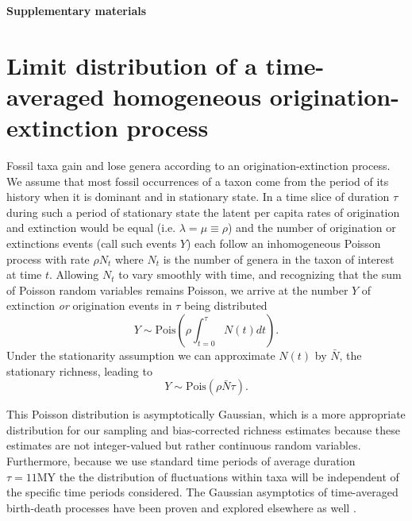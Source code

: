 \documentclass[12pt]{article}
\let\citep=\cite
\begin{document}
\clearpage

\newcommand{\beginsupplement}{%
  \setcounter{table}{0}
  \renewcommand{\thetable}{S\arabic{table}}%
  \setcounter{figure}{0}
  \renewcommand{\thefigure}{S\arabic{figure}}%
  \setcounter{section}{0}
  \renewcommand{\thesection}{S\arabic{section}}%
}

\beginsupplement

\begin{center}
{\LARGE \bf Supplementary materials}
\end{center}
\vspace{2em}

\section{Limit distribution of a time-averaged homogeneous
  origination-extinction process}
\label{sec:suppLimitDist}

Fossil taxa gain and lose genera according to an
origination-extinction process. We assume that most fossil occurrences
of a taxon come from the period of its history when it is dominant and
in stationary state. In a time slice of duration $\tau$ during such a
period of stationary state the latent per capita rates of origination and
extinction would be equal (i.e. $\lambda = \mu \equiv \rho$) and the
number of origination or extinctions events (call such events $Y$)
each follow an inhomogeneous Poisson process with rate $\rho N_t$
where $N_t$ is the number of genera in the taxon of interest at time
$t$. Allowing $N_t$ to vary smoothly with time, and recognizing that
the sum of Poisson random variables remains Poisson, we arrive at the
number $Y$ of extinction \emph{or} origination events in $\tau$ being
distributed
\begin{equation}
  \label{eq:eventPois1}
  Y \sim \text{Pois}\left(\rho \int_{t=0}^\tau N(t) dt\right).
\end{equation}
Under the stationarity assumption we can approximate $N(t)$ by
$\bar{N}$, the stationary richness, leading to
\begin{equation}
  \label{eq:eventPois2}
  Y \sim \text{Pois}(\rho \bar{N} \tau).
\end{equation}

This Poisson distribution is asymptotically Gaussian, which is a more
appropriate distribution for our sampling and bias-corrected richness
estimates because these estimates are not integer-valued but rather
continuous random variables. Furthermore, because we use standard time
periods of average duration $\tau = 11\text{MY}$ the the distribution
of fluctuations within taxa will be independent of the specific time
periods considered. The Gaussian asymptotics of time-averaged
birth-death processes have been proven and explored elsewhere as well
\citep{grassmann1987}.
\end{document}
